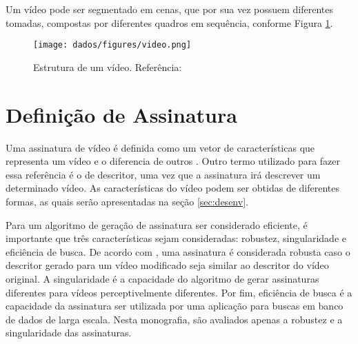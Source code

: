     
    Um vídeo pode ser segmentado em cenas, que por sua vez possuem diferentes tomadas, compostas por diferentes quadros em sequência, conforme Figura \ref{fig:video}. 
    
    
 
    
    \begin{figure}[h]
        \centering
        \texttt{[image: dados/figures/video.png]}
        \caption{Estrutura de um vídeo. Referência: \cite{santos2004segmentaccao}}
    	\label{fig:video}
    \end{figure}

  	\section{Definição de Assinatura}
    \label{sec:signature}
    
    	Uma assinatura de vídeo é definida como um vetor de características que representa um vídeo e o diferencia de outros \cite{lee2008robust}. Outro termo utilizado para fazer essa referência é o de descritor, uma vez que a assinatura irá descrever um determinado vídeo. As características do vídeo podem ser obtidas de diferentes formas, as quais serão apresentadas na seção \ref{sec:desenv}.
        
       Para um algoritmo de geração de assinatura ser considerado eficiente, é importante que três características sejam consideradas: robustez, singularidade e eficiência de busca. De acordo com \cite{lee2008robust}, uma assinatura é considerada robusta caso o descritor gerado para um vídeo modificado seja similar ao descritor do vídeo original. A singularidade é a capacidade do algoritmo de gerar assinaturas diferentes para vídeos perceptivelmente diferentes. Por fim, eficiência de busca é a capacidade da assinatura  ser utilizada por uma aplicação para buscas em banco de dados de larga escala. Nesta monografia, são avaliados apenas a robustez e a singularidade das assinaturas.
        
